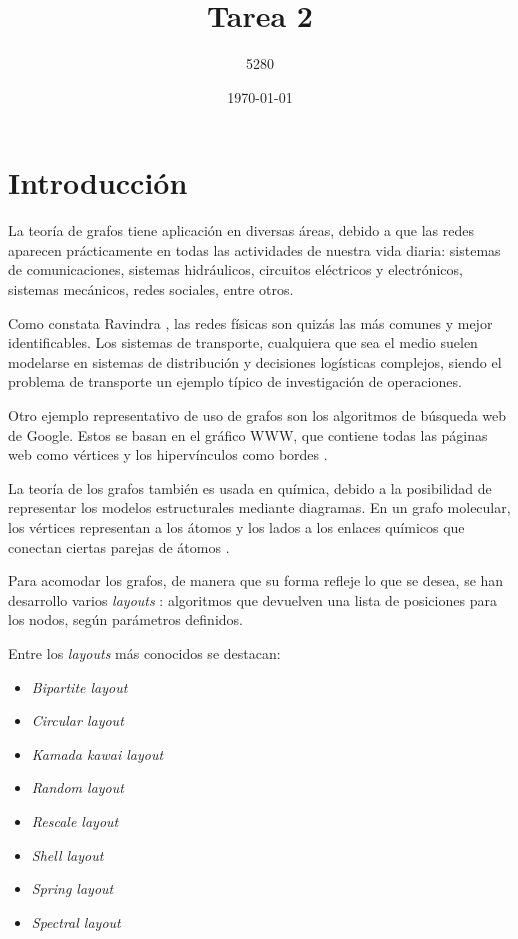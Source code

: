 \documentclass{article}
\title{
Tarea 2
}
\author{5280}
\date{\today}
\begin{document}
\maketitle


\section*{Introducción}

La teoría de grafos tiene aplicación en diversas áreas, debido a que las redes aparecen prácticamente en todas las actividades de nuestra vida diaria: sistemas de comunicaciones, sistemas hidráulicos, circuitos eléctricos y electrónicos, sistemas mecánicos, redes sociales, entre otros. 

Como constata Ravindra \cite{ahuja2017network}, las redes físicas son quizás las más comunes y mejor identificables. Los sistemas de transporte, cualquiera que sea el medio suelen modelarse en sistemas de distribución  y decisiones logísticas complejos, siendo el problema de transporte un ejemplo típico de investigación de operaciones. 

Otro ejemplo representativo de uso de grafos son los algoritmos de búsqueda web de Google. Estos se basan en el gráfico WWW, que contiene todas las páginas web como vértices y los  hipervínculos como bordes \cite{chung2010graph}.

La teoría de los grafos también es usada en química, debido a la posibilidad de representar los modelos estructurales mediante diagramas. En un grafo molecular, los vértices representan a los átomos y los lados a los enlaces químicos que conectan ciertas parejas de átomos \cite{amador}.

Para acomodar los grafos, de manera que su forma refleje lo que se desea, se han desarrollo varios \textit{layouts} : algoritmos que devuelven una lista de posiciones para los nodos, según  parámetros definidos.

Entre los \textit{layouts} más conocidos se destacan:

\begin{itemize}

\item  \textit{Bipartite layout}
\item  \textit{Circular layout}
\item  \textit{Kamada kawai layout}
\item  \textit{Random layout}
\item  \textit{Rescale layout}
\item  \textit{Shell layout}
\item  \textit{Spring layout}
\item  \textit{Spectral layout}
\end{itemize}
\end{document}
